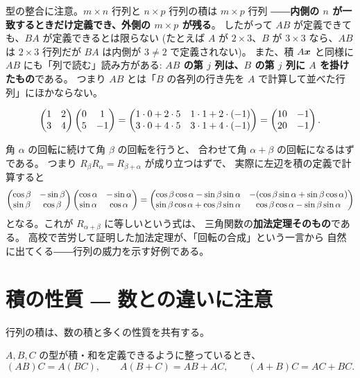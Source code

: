 \begin{chui}
型の整合に注意。$m \times n$ 行列と $n \times p$ 行列の積は $m \times p$ 行列
――\textbf{内側の $n$ が一致するときだけ定義でき、外側の $m \times p$ が残る}。
したがって $AB$ が定義できても、$BA$ が定義できるとは限らない
(たとえば $A$ が $2 \times 3$、$B$ が $3 \times 3$ なら、$AB$ は $2 \times 3$ 行列だが
$BA$ は内側が $3 \ne 2$ で定義されない)。
また、積 $A\bm{x}$ と同様に $AB$ にも「列で読む」読み方がある:
\textbf{$AB$ の第 $j$ 列は、$B$ の第 $j$ 列に $A$ を掛けたもの}である。
つまり $AB$ とは「$B$ の各列の行き先を $A$ で計算して並べた行列」にほかならない。
\end{chui}

\begin{rei}
\[
\begin{pmatrix}1 & 2 \\ 3 & 4\end{pmatrix} \begin{pmatrix}0 & 1 \\ 5 & -1\end{pmatrix}
= \begin{pmatrix}1\cdot 0 + 2 \cdot 5 & 1 \cdot 1 + 2 \cdot (-1) \\
       3\cdot 0 + 4 \cdot 5 & 3 \cdot 1 + 4 \cdot (-1)\end{pmatrix}
= \begin{pmatrix}10 & -1 \\ 20 & -1\end{pmatrix}.
\]
\end{rei}

\begin{rei}[回転の合成と加法定理]
角 $\alpha$ の回転に続けて角 $\beta$ の回転を行うと、
合わせて角 $\alpha + \beta$ の回転になるはずである。
つまり $R_\beta R_\alpha = R_{\beta + \alpha}$ が成り立つはずで、
実際に左辺を積の定義で計算すると
\[
\begin{pmatrix}\cos\beta & -\sin\beta \\ \sin\beta & \cos\beta\end{pmatrix}
\begin{pmatrix}\cos\alpha & -\sin\alpha \\ \sin\alpha & \cos\alpha\end{pmatrix}
= \begin{pmatrix}
\cos\beta\cos\alpha - \sin\beta\sin\alpha &
-(\cos\beta\sin\alpha + \sin\beta\cos\alpha) \\
\sin\beta\cos\alpha + \cos\beta\sin\alpha &
\cos\beta\cos\alpha - \sin\beta\sin\alpha\end{pmatrix}
\]
となる。これが $R_{\alpha+\beta}$ に等しいという式は、
三角関数の\textbf{加法定理そのもの}である。
高校で苦労して証明した加法定理が、「回転の合成」という一言から
自然に出てくる――行列の威力を示す好例である。
\end{rei}

\section{積の性質 ― 数との違いに注意}

行列の積は、数の積と多くの性質を共有する。

\begin{teiri}[積の計算法則]\label{thm:matmul-rules}
$A, B, C$ の型が積・和を定義できるように整っているとき、
\[
(AB)C = A(BC), \qquad
A(B + C) = AB + AC, \qquad
(A + B)C = AC + BC.
\]
\end{teiri}

